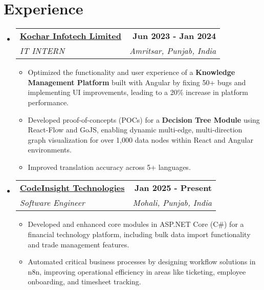 \documentclass[letterpaper,11pt]{article}
\makeatletter
\newcommand{\resumeItem}[1]{
  \item\small{
    {#1 \vspace{-2pt}}
  }
}
\newcommand{\resumeSubheading}[4]{
  \vspace{-2pt}\item
    \begin{tabular*}{1.0\textwidth}[t]{l@{\extracolsep{\fill}}r}
      \textbf{#1} & \textbf{\small #2} \\
      \textit{\small#3} & \textit{\small #4} \\
    \end{tabular*}\vspace{-7pt}
}
\newcommand{\resumeSubHeadingListStart}{\begin{itemize}[leftmargin=0.0in, label={}]}
\newcommand{\resumeSubHeadingListEnd}{\end{itemize}}
\newcommand{\resumeItemListStart}{\justify \begin{itemize} \vspace{-4pt}}
\newcommand{\resumeItemListEnd}{\end{itemize}\vspace{-1pt}}
\makeatother
\begin{document}
\section{Experience}
  \resumeSubHeadingListStart
    \resumeSubheading
      {\href{https://www.kochartech.com/}{Kochar Infotech Limited}}{Jun 2023 - Jan 2024}
      {IT INTERN}{Amritsar, Punjab, India}
      \resumeItemListStart
        \resumeItem{Optimized the functionality and user experience of a \textbf{Knowledge Management Platform} built with Angular by fixing 50+ bugs and implementing UI improvements, leading to a 20\% increase in platform performance.}
        \resumeItem{Developed proof-of-concepts (POCs) for a \textbf{Decision Tree Module} using React-Flow and GoJS, enabling dynamic multi-edge, multi-direction graph visualization for over 1,000 data nodes within React and Angular environments.}
        \resumeItem{Improved translation accuracy across 5+ languages.}
      \resumeItemListEnd
    
    \resumeSubheading
      {\href{https://www.thecodeinsight.com/}{CodeInsight Technologies}}{Jan 2025 - Present}
      {Software Engineer}{Mohali, Punjab, India}
      \resumeItemListStart
        \resumeItem{Developed and enhanced core modules in ASP.NET Core (C#) for a financial technology platform, including bulk data import functionality and trade management features.}
        \resumeItem{Automated critical business processes by designing workflow solutions in n8n, improving operational efficiency in areas like ticketing, employee onboarding, and timesheet tracking.}
      \resumeItemListEnd
  \resumeSubHeadingListEnd




\end{document}
